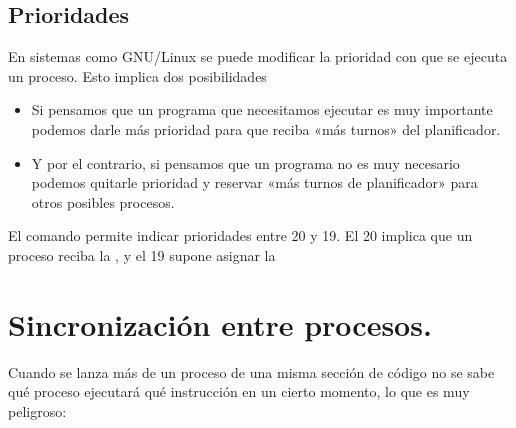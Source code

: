\documentclass[letterpaper,10pt,spanish]{sphinxmanual}
\begin{document}
\subsection{Prioridades}
\label{\detokenize{textos/tema1:prioridades}}
En sistemas como GNU/Linux se puede modificar la prioridad con que se ejecuta un proceso. Esto implica dos posibilidades
\begin{itemize}
\item {} 
Si pensamos que un programa que necesitamos ejecutar es muy importante podemos darle más prioridad para que reciba «más turnos» del planificador.

\item {} 
Y por el contrario, si pensamos que un programa no es muy necesario podemos quitarle prioridad y reservar «más turnos de planificador» para otros posibles procesos.

\end{itemize}

El comando  permite indicar prioridades entre \sphinxhyphen{}20 y 19. El \sphinxhyphen{}20 implica que un proceso reciba la , y el 19 supone asignar la 


\section{Sincronización entre procesos.}
\label{\detokenize{textos/tema1:sincronizacion-entre-procesos}}
Cuando se lanza más de un proceso de una misma sección de código no se sabe qué proceso ejecutará qué instrucción en un cierto momento, lo que es muy peligroso:

\begin{sphinxVerbatim}[commandchars=\\\{\}]
 
 
\end{sphinxVerbatim}
\end{document}

